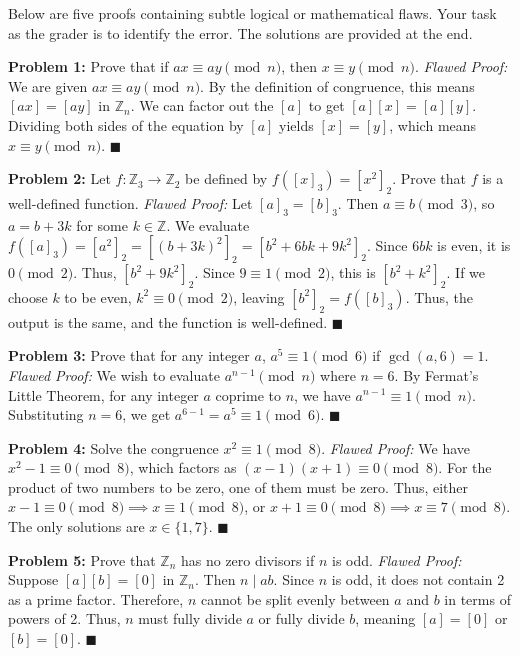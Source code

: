 \documentclass[11pt, a4paper]{article}
\theoremstyle{definition}
\theoremstyle{remark}
\newcommand{\Z}{\mathbb{Z}}
\begin{document}
Below are five proofs containing subtle logical or mathematical flaws. Your task as the grader is to identify the error. The solutions are provided at the end.

\textbf{Problem 1:} Prove that if $ax \equiv ay \pmod n$, then $x \equiv y \pmod n$.
\textit{Flawed Proof:} We are given $ax \equiv ay \pmod n$. By the definition of congruence, this means $[ax] = [ay]$ in $\Z_n$. We can factor out the $[a]$ to get $[a][x] = [a][y]$. Dividing both sides of the equation by $[a]$ yields $[x] = [y]$, which means $x \equiv y \pmod n$. $\blacksquare$

\textbf{Problem 2:} Let $f: \Z_3 \to \Z_2$ be defined by $f([x]_3) = [x^2]_2$. Prove that $f$ is a well-defined function.
\textit{Flawed Proof:} Let $[a]_3 = [b]_3$. Then $a \equiv b \pmod 3$, so $a = b + 3k$ for some $k \in \Z$. We evaluate $f([a]_3) = [a^2]_2 = [(b+3k)^2]_2 = [b^2 + 6bk + 9k^2]_2$. Since $6bk$ is even, it is $0 \pmod 2$. Thus, $[b^2 + 9k^2]_2$. Since $9 \equiv 1 \pmod 2$, this is $[b^2 + k^2]_2$. If we choose $k$ to be even, $k^2 \equiv 0 \pmod 2$, leaving $[b^2]_2 = f([b]_3)$. Thus, the output is the same, and the function is well-defined. $\blacksquare$

\textbf{Problem 3:} Prove that for any integer $a$, $a^5 \equiv 1 \pmod 6$ if $\gcd(a, 6) = 1$.
\textit{Flawed Proof:} We wish to evaluate $a^{n-1} \pmod n$ where $n=6$. By Fermat's Little Theorem, for any integer $a$ coprime to $n$, we have $a^{n-1} \equiv 1 \pmod n$. Substituting $n=6$, we get $a^{6-1} = a^5 \equiv 1 \pmod 6$. $\blacksquare$

\textbf{Problem 4:} Solve the congruence $x^2 \equiv 1 \pmod 8$.
\textit{Flawed Proof:} We have $x^2 - 1 \equiv 0 \pmod 8$, which factors as $(x-1)(x+1) \equiv 0 \pmod 8$. For the product of two numbers to be zero, one of them must be zero. Thus, either $x-1 \equiv 0 \pmod 8 \implies x \equiv 1 \pmod 8$, or $x+1 \equiv 0 \pmod 8 \implies x \equiv 7 \pmod 8$. The only solutions are $x \in \{1, 7\}$. $\blacksquare$

\textbf{Problem 5:} Prove that $\Z_n$ has no zero divisors if $n$ is odd.
\textit{Flawed Proof:} Suppose $[a][b] = [0]$ in $\Z_n$. Then $n \mid ab$. Since $n$ is odd, it does not contain 2 as a prime factor. Therefore, $n$ cannot be split evenly between $a$ and $b$ in terms of powers of 2. Thus, $n$ must fully divide $a$ or fully divide $b$, meaning $[a]=[0]$ or $[b]=[0]$. $\blacksquare$
\end{document}
